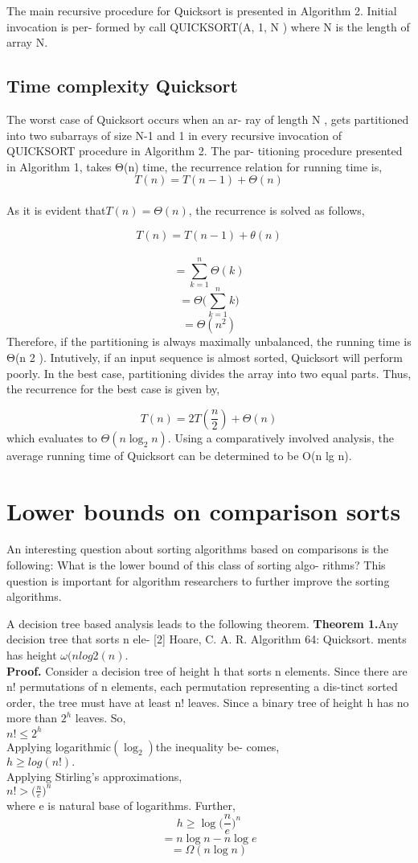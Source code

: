 \documentclass[a4paper, 10pt,twocolumn]{article}
\begin{document}
The main recursive procedure for Quicksort is presented in Algorithm 2. Initial invocation is per-
formed by call QUICKSORT(A, 1, N ) where N is
the length of array N.
\subsection{Time complexity
Quicksort}
The worst case of Quicksort occurs when an ar-
ray of length N , gets partitioned into two subarrays
of size N-1 and 1 in every recursive invocation of
QUICKSORT procedure in Algorithm 2. The par-
titioning procedure presented in Algorithm 1, takes
Θ(n) time, the recurrence relation for running time
is,\\

$$ T(n)=T(n-1)+\Theta(n)$$\\
As it is evident that$ T(n)=\Theta (n) $, the recurrence is solved as follows,

$$T(n)=T(n-1)+\theta(n)$$\\
$$= \sum_{k=1}^{n}\Theta(k)$$
$$=\Theta\Bigg(\sum_{k=1}^{n} k\Bigg)$$
$$=\Theta(n^2)$$
Therefore, if the partitioning is always maximally unbalanced,
the running time is Θ(n 2 ). Intutively, if an input sequence is almost sorted, Quicksort will perform poorly. In the best case, partitioning divides the array into two equal parts. Thus, the recurrence for the best case is given by,

$$T(n)=2T(\frac{n}{2})+\Theta(n)$$
which evaluates to $\Theta(n \log_2 n)$. Using a comparatively involved analysis, the average running time of Quicksort can be determined to be O(n lg n).
\section{Lower bounds on comparison sorts}
An interesting question about sorting algorithms
based on comparisons is the following: What is
the lower bound of this class of sorting algo-
rithms? This question is important for algorithm
researchers to further improve the sorting algorithms.

A decision tree based analysis leads to the following theorem\cite{one}.
\textbf{Theorem 1.}Any decision tree that sorts n ele- [2] Hoare, C. A. R. Algorithm 64: Quicksort.
ments has height $\omega(n log 2 (n).$\\
\textbf{Proof.} Consider a decision tree of height h that sorts n elements. Since there are n! permutations of n elements, each permutation representing a dis-tinct sorted order, the tree must have at least n$!$
leaves. Since a binary tree of height h has no more than $ 2^h$ leaves. So,\\
$n!\leq 2^h$\\
Applying logarithmic$(\log_2)$the inequality be-
comes,\\
$h \geq log (n!).$\\
Applying Stirling’s approximations,\\
$n! > \Big(\frac{n}{e} \Big)^n$\\
where e is natural base of logarithms. Further,\\
$$h \geq \log  \Big(\frac{n}{e} \Big)^n$$
$$=n \log n - n \log e$$
$$=\Omega (n \log n)$$
\end{document}

